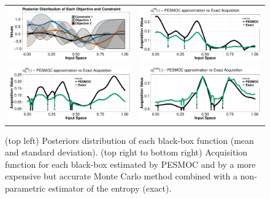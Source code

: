 \documentclass[review,preprint,12pt]{elsarticle}
\providecommand{\DIFdelend}{} %
\begin{document}
\DIFdelend \begin{figure}[htb]
\begin{center}
\begin{tabular}{cc}
        \includegraphics[width=0.45\linewidth]{figures/acquisition/plot_posterior.pdf} &
        \includegraphics[width=0.45\linewidth]{figures/acquisition/plot_acq_obj_1.pdf} \\
        \includegraphics[width=0.45\linewidth]{figures/acquisition/plot_acq_obj_2.pdf} &
        \includegraphics[width=0.45\linewidth]{figures/acquisition/plot_acq_con_1.pdf}
\end{tabular}
\caption{(top left) Posteriors distribution of each black-box function (mean and standard deviation).
	(top right to bottom right) Acquisition function for each black-box estimated by PESMOC and by a 
	more expensive but accurate Monte Carlo method combined with a non-parametric estimator of the entropy (exact). 
	}
        \label{fig:exact_decoupled}
\end{center}
\end{figure}
\end{document}
